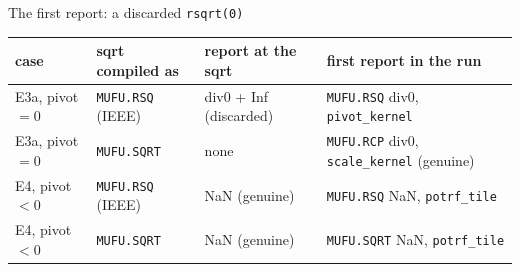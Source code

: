 \documentclass[aspectratio=169,10pt,xcolor=table]{beamer}
\begin{document}
\begin{frame}[fragile]{The first report: a discarded \texttt{rsqrt(0)}}
\vspace{1mm}\centering\scriptsize
\begin{tabular}{llll}
\toprule
case & sqrt compiled as & report at the sqrt & first report in the run\\
\midrule
E3a, pivot $=0$ & \texttt{MUFU.RSQ} (IEEE) & div0 + Inf (discarded) & \texttt{MUFU.RSQ} div0, \texttt{pivot\_kernel}\\
E3a, pivot $=0$ & \texttt{MUFU.SQRT} & none & \texttt{MUFU.RCP} div0, \texttt{scale\_kernel} (genuine)\\
E4, pivot $<0$ & \texttt{MUFU.RSQ} (IEEE) & NaN (genuine) & \texttt{MUFU.RSQ} NaN, \texttt{potrf\_tile}\\
E4, pivot $<0$ & \texttt{MUFU.SQRT} & NaN (genuine) & \texttt{MUFU.SQRT} NaN, \texttt{potrf\_tile}\\
\bottomrule
\end{tabular}
\end{frame}
\end{document}
